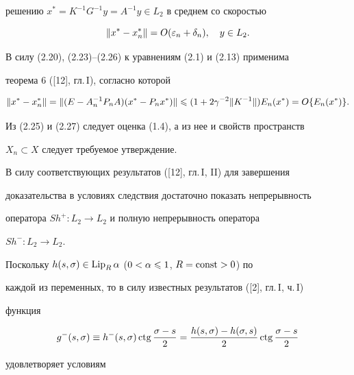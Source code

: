 решению $x^* = K^{-1}G^{-1}y = A^{-1}y \in L_2$ в среднем со скоростью


\begin{equation}


\|x^* - x_n^*\| = O(\ve_n+\delta_n),\quad y\in L_2.


\end{equation}





В силу (2.20), (2.23)--(2.26) к уравнениям (2.1) и (2.13) применима


теорема 6 ([12], гл.\,I), согласно которой


\begin{equation}


\|x^* - x_n^*\| = \|(E-A_n^{-1}P_nA)(x^*-P_nx^*)\|\lea


(1+2\gamma^{-2}\|K^{-1}\|)E_n(x^*) = O\{E_n(x^*)\}.


\end{equation}





Из (2.25) и (2.27) следует оценка (1.4), а из нее и свойств пространств


$X_n\subset X$  следует требуемое утверждение.





В силу соответствующих результатов ([12], гл.\,I, II) для завершения


доказательства в условиях следствия достаточно показать непрерывность


оператора $Sh^+:L_2\to L_2$ и полную непрерывность оператора


$Sh^-:L_2\to L_2$.





Поскольку $h(s,\sigma)\in \operatorname{Lip}_R \alpha$ ($0<\alpha\leqslant 1$, $R=\operatorname{const}>0$) по


каждой из переменных, то в силу известных результатов ([2], гл.\,I, ч.\,I)


функция


\begin{equation}


g^-(s,\si) \equiv h^-(s,\si)\ctg\frac{\si-s}{2} = \frac{h(s,\si)-


h(\si,s)}{2}\ctg\frac{\si-s}{2}


\end{equation}


удовлетворяет условиям


